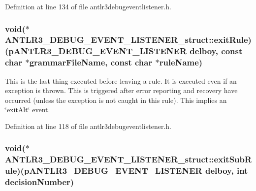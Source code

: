 Definition at line 134 of file antlr3debugeventlistener.\-h.

\hypertarget{struct_a_n_t_l_r3___d_e_b_u_g___e_v_e_n_t___l_i_s_t_e_n_e_r__struct_ae8755b1f41540b344fae90a94d3a3ba8}{
\subsubsection[{exit\-Rule}]{\setlength{\rightskip}{0pt plus 5cm}void($\ast$ A\-N\-T\-L\-R3\-\_\-\-D\-E\-B\-U\-G\-\_\-\-E\-V\-E\-N\-T\-\_\-\-L\-I\-S\-T\-E\-N\-E\-R\-\_\-struct\-::exit\-Rule)({\bf p\-A\-N\-T\-L\-R3\-\_\-\-D\-E\-B\-U\-G\-\_\-\-E\-V\-E\-N\-T\-\_\-\-L\-I\-S\-T\-E\-N\-E\-R} delboy, const char $\ast${\bf grammar\-File\-Name}, const char $\ast$rule\-Name)}}\label{struct_a_n_t_l_r3___d_e_b_u_g___e_v_e_n_t___l_i_s_t_e_n_e_r__struct_ae8755b1f41540b344fae90a94d3a3ba8}
This is the last thing executed before leaving a rule. It is executed even if an exception is thrown. This is triggered after error reporting and recovery have occurred (unless the exception is not caught in this rule). This implies an \char`\"{}exit\-Alt\char`\"{} event. 

Definition at line 118 of file antlr3debugeventlistener.\-h.

\hypertarget{struct_a_n_t_l_r3___d_e_b_u_g___e_v_e_n_t___l_i_s_t_e_n_e_r__struct_a29c55fdd3dc6399e0b89303694fac424}{
\subsubsection[{exit\-Sub\-Rule}]{\setlength{\rightskip}{0pt plus 5cm}void($\ast$ A\-N\-T\-L\-R3\-\_\-\-D\-E\-B\-U\-G\-\_\-\-E\-V\-E\-N\-T\-\_\-\-L\-I\-S\-T\-E\-N\-E\-R\-\_\-struct\-::exit\-Sub\-Rule)({\bf p\-A\-N\-T\-L\-R3\-\_\-\-D\-E\-B\-U\-G\-\_\-\-E\-V\-E\-N\-T\-\_\-\-L\-I\-S\-T\-E\-N\-E\-R} delboy, int decision\-Number)}}\label{struct_a_n_t_l_r3___d_e_b_u_g___e_v_e_n_t___l_i_s_t_e_n_e_r__struct_a29c55fdd3dc6399e0b89303694fac424}


